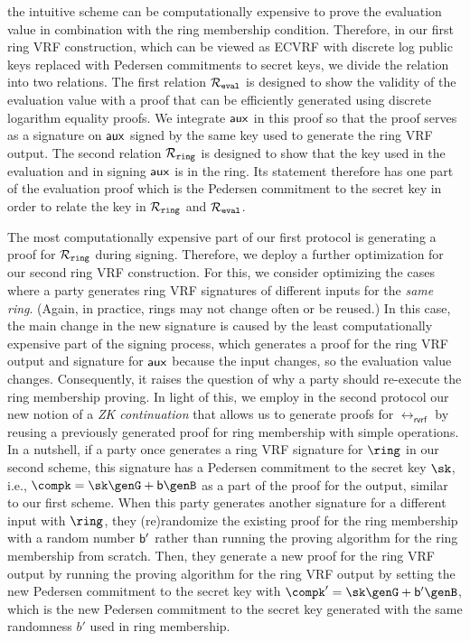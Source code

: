 the intuitive scheme can be computationally expensive to prove the evaluation value in combination with the ring membership condition. Therefore, in our first ring VRF construction, which can be viewed as ECVRF with discrete log public keys replaced with Pedersen commitments to secret keys, we divide the relation into two relations. The first relation $ \mathcal{R}_{\mathtt{eval}} $ is designed  to show the validity of the evaluation value with a proof that can be efficiently generated using discrete logarithm equality proofs.  We integrate $ \mathsf{aux} $ in this proof so that the proof serves as a signature on $ \mathsf{aux} $ signed by the same key used to generate the ring VRF output.   The second relation $ \mathcal{R}_{\mathtt{ring}} $ is designed to show that the key used in the evaluation and in signing $ \mathsf{aux} $ is in the ring. Its statement therefore has one part of the evaluation proof which is the Pedersen commitment to the secret key in order to relate the key in $ \mathcal{R}_{\mathtt{ring}} $ and $ \mathcal{R}_{\mathtt{eval}} $.

The most computationally expensive part of our first protocol is generating a proof for $ \mathcal{R}_{\mathtt{ring}} $ during signing. Therefore, we deploy a further optimization for our second ring VRF construction. For this,  we consider optimizing the cases where a party generates ring VRF signatures of different inputs for the \emph{same ring}. (Again, in practice, rings may not change often or be reused.) In this case, the main change in the new signature is caused by the least computationally expensive part of the signing process, which generates a proof for the ring VRF output and signature for $ \mathsf{aux} $  because the input changes, so the evaluation value changes.  Consequently, it raises the question of why a party should re-execute the ring membership proving.  In light of this, we employ in the second protocol our  new notion of a \emph{ZK continuation} that allows us to generate proofs for $ \rel_{\mathsf{rvrf}} $ by reusing a previously generated proof for ring membership with simple operations. 
In a nutshell, if a party once generates a ring VRF signature for $ \ring $ in our second scheme, this signature has a  Pedersen commitment to the secret key $ \sk $, i.e., $ \compk = \sk \genG + \openpk \genB $ as a part of the proof for the output, similar to our first scheme.  When this party generates another signature for a different input  with $ \ring $, they (re)randomize the  existing proof for the ring membership with a random number $ \mathsf{b}' $ rather than  running the proving algorithm for the ring membership from scratch. Then, they generate a new proof for the ring VRF output by running the proving algorithm for the ring VRF output by setting the new Pedersen commitment to the secret key with $ \compk' = \sk \genG + \openpk'\genB $, which is the new  Pedersen commitment to the secret key generated  with the same randomness $ b' $ used in ring membership.



